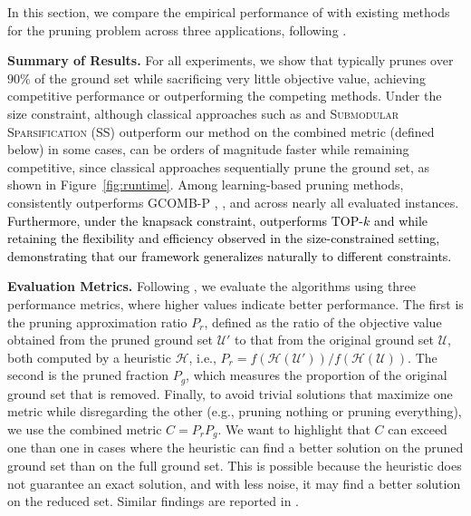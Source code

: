 In this section, we compare the empirical performance of \llm with existing methods for the pruning problem across three applications, following \citep{ireland2022lense,manchanda2020gcomb,pmlr-v258-nath25a}. 

\textbf{Summary of Results.} For all experiments, we show that \llm typically prunes over $90\%$ of the ground set while sacrificing very little objective value, achieving competitive performance or outperforming the competing methods. Under the size constraint, although classical approaches such as \qp \citep{pmlr-v258-nath25a} and \textsc{Submodular Sparsification (SS)} \citep{zhou2017scaling} outperform our method on the combined metric (defined below) in some cases, \llm can be orders of magnitude faster while remaining competitive, since classical approaches sequentially prune the ground set, as shown in Figure~\ref{fig:runtime}. Among learning-based pruning methods, \llm consistently outperforms GCOMB-P \citep{manchanda2020gcomb}, \lense \citep{ireland2022lense}, and \comb \citep{tian2024combhelper} across nearly all evaluated instances. \textcolor{black}{Furthermore, under the knapsack constraint, \llm outperforms TOP-$k$ and \qp  while retaining the flexibility and efficiency observed in the size-constrained setting, demonstrating that our framework generalizes naturally to different constraints.}

\textbf{Evaluation Metrics.} Following \cite{ireland2022lense,pmlr-v258-nath25a}, we evaluate the algorithms using three performance metrics, where higher values indicate better performance. The first is the pruning approximation ratio $P_r$, defined as the ratio of the objective value obtained from the pruned ground set $\mathcal{U}'$ to that from the original ground set $\mathcal{U}$, both computed by a heuristic $\mathcal{H}$, i.e., $P_r = f(\mathcal{H}(\mathcal{U}')) / f(\mathcal{H}(\mathcal{U}))$. The second is the pruned fraction $P_g$, which measures the proportion of the original ground set that is removed. Finally, to avoid trivial solutions that maximize one metric while disregarding the other (e.g., pruning nothing or pruning everything), we use the combined metric $C = P_rP_g$. We want to highlight that $C$ can exceed one than one in cases where the heuristic can find a better solution on the pruned ground set than on the full ground set. This is possible because the heuristic does not guarantee an exact solution, and with less noise, it may find a better solution on the reduced set. Similar findings are reported in \cite{ireland2022lense}.



